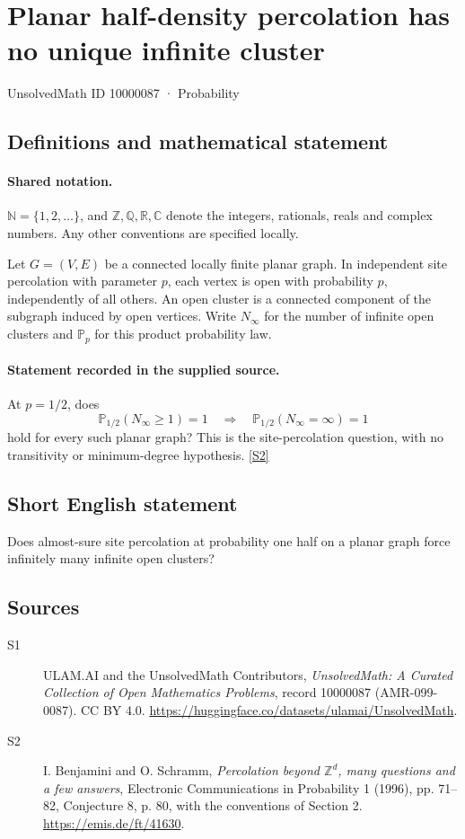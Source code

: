 \documentclass[11pt]{article}
\newcommand{\sref}[2]{\hyperlink{source:#1:#2}{[S#2]}}
\begin{document}
\setcounter{section}{10000086}
\section{Planar half-density percolation has no unique infinite cluster}\label{10000087}
{\small\sffamily UnsolvedMath ID 10000087 · Probability}
\subsection{Definitions and mathematical statement}

\paragraph{Shared notation.}$\mathbb N=\{1,2,\ldots\}$, and $\mathbb Z,\mathbb Q,\mathbb R,\mathbb C$ denote the integers, rationals, reals and complex numbers. Any other conventions are specified locally.


Let $G=(V,E)$ be a connected locally finite planar graph. In independent site percolation with parameter $p$, each vertex is open with probability $p$, independently of all others. An open cluster is a connected component of the subgraph induced by open vertices. Write $N_\infty$ for the number of infinite open clusters and $\mathbb P_p$ for this product probability law.
\paragraph{Statement recorded in the supplied source.}
At $p=1/2$, does
\[\mathbb P_{1/2}(N_\infty\ge1)=1\quad\Longrightarrow\quad\mathbb P_{1/2}(N_\infty=\infty)=1\]
hold for every such planar graph? This is the site-percolation question, with no transitivity or minimum-degree hypothesis. \sref{10000087}{2}
\subsection{Short English statement}
Does almost-sure site percolation at probability one half on a planar graph force infinitely many infinite open clusters?
\subsection{Sources}
\begin{description}
\item[\hypertarget{source:10000087:1}{S1}] ULAM.AI and the UnsolvedMath Contributors, \emph{UnsolvedMath: A Curated Collection of Open Mathematics Problems}, record 10000087 (AMR-099-0087). CC BY 4.0. \url{https://huggingface.co/datasets/ulamai/UnsolvedMath}.
\item[\hypertarget{source:10000087:2}{S2}] I. Benjamini and O. Schramm, \emph{Percolation beyond $\mathbb Z^d$, many questions and a few answers}, Electronic Communications in Probability 1 (1996), pp. 71--82, Conjecture 8, p. 80, with the conventions of Section 2. \url{https://emis.de/ft/41630}.
\end{description}
\label{end:10000087}
\end{document}
